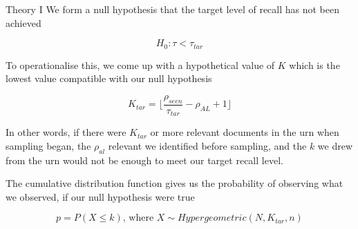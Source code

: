 \documentclass[9pt,aspectratio=169]{beamer}
\begin{document}
\begin{frame}{Theory I}
We form a null hypothesis that the target level of recall has not been achieved

\begin{equation}
H_0 : \tau < \tau_{tar}
\end{equation}

To operationalise this, we come up with a hypothetical value of $K$ which is the lowest value compatible with our null hypothesis

\begin{equation}
K_{tar} = \lfloor \frac{\rho_{seen}}{\tau_{tar}}-\rho_{AL}+1 \rfloor
\end{equation}

In other words, if there were $K_{tar}$ or more relevant documents in the urn when sampling began, the $\rho_{al}$ relevant we identified before sampling, and the $k$ we drew from the urn would not be enough to meet our target recall level.

\medskip 

The cumulative distribution function gives us the probability of observing what we observed, if our null hypothesis were true

\begin{equation}
p = P(X \leq k) \text{, where } X \sim Hypergeometric(N,K_{tar},n)
\label{eq:p-value}
\end{equation}

\end{frame}
\end{document}
